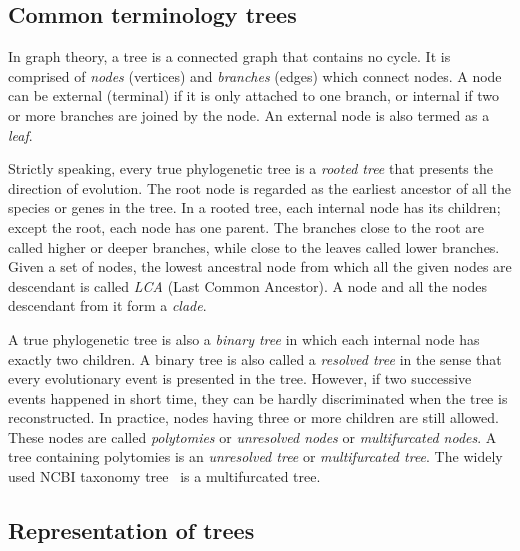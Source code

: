 \subsection{Common terminology  trees}
In graph theory, a tree is a connected graph that contains no cycle.
It is comprised of \emph{nodes} (vertices) and \emph{branches}
(edges)
which connect nodes. A node can be external (terminal)
if it is only attached to one branch,
or internal if two or more branches are joined by the node.
An external node is also termed as a \emph{leaf}.

Strictly speaking, every true phylogenetic tree is a \emph{rooted tree} that presents the direction of
evolution. The root node is regarded as the earliest ancestor of all the species or genes
in the tree. In a rooted tree, each internal node has its children; except the root, each node has
one parent. The branches close to the root are called higher or deeper
branches, while close to
the leaves called lower branches.
Given a set of nodes, the lowest ancestral node from which all the given nodes are descendant
is called \emph{LCA} (Last Common Ancestor). A node and
all the nodes descendant from it form a \emph{clade}.

A true phylogenetic tree is also a \emph{binary tree} in which each internal node has exactly two children.
A binary tree is also called a \emph{resolved tree} in the sense that every evolutionary event
is presented in the tree. However, if two successive events happened in  short time,
they can be hardly discriminated when the tree is reconstructed. In practice, nodes having
three or more children are still allowed. These nodes are called
\emph{polytomies}
or \emph{unresolved nodes} or
\emph{multifurcated nodes}.
A tree containing polytomies is an \emph{unresolved tree}
or \emph{multifurcated tree}.
The widely used NCBI taxonomy tree~\cite{wheeler05} is a multifurcated tree.

\subsection{Representation of trees}

